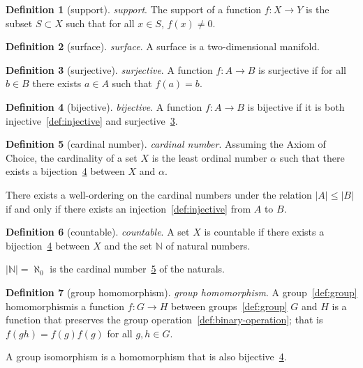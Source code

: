 \documentclass[12pt,a4paper]{article}
\theoremstyle{definition}
\newtheorem{definition}{Definition}
\begin{document}
\begin{definition}[support]\label{def:support}
\emph{support}. The support of a function $f: X \to Y$ is the subset $S \subset X$ such that for all $x \in S$, $f(x) \neq 0$.
\end{definition}

\begin{definition}[surface]\label{def:surface}
\emph{surface}. A surface is a two-dimensional manifold.
\end{definition}

\begin{definition}[surjective]\label{def:surjective}
\emph{surjective}. A function $f:A\to B$ is surjective if for all $b \in B$ there exists $a\in A$ such that $f(a)=b$.
\end{definition}

\begin{definition}[bijective]\label{def:bijective}
\emph{bijective}. A function $f:A\to B$ is bijective if it is both injective~\ref{def:injective} and surjective~\ref{def:surjective}.
\end{definition}

\begin{definition}[cardinal number]\label{def:cardinal-number}
\emph{cardinal number}. Assuming the Axiom of Choice, the cardinality of a set $X$ is the least ordinal number $\alpha$ such that there exists a bijection~\ref{def:bijective} between $X$ and $\alpha$. 

There exists a well-ordering on the cardinal numbers under the relation $\vert A\vert  \leq \vert B\vert $ if and only if there exists an injection~\ref{def:injective} from $A$ to $B$.
\end{definition}

\begin{definition}[countable]\label{def:countable}
\emph{countable}. A set $X$ is countable if there exists a bijection~\ref{def:bijective} between $X$ and the set $\mathbb N$ of natural numbers. 

$\vert \mathbb N\vert = \aleph_0$ is the cardinal number~\ref{def:cardinal-number} of the naturals.
\end{definition}

\begin{definition}[group homomorphism]\label{def:group-homomorphism}
\emph{group homomorphism}. A group~\ref{def:group} homomorphismis a function $f: G\to H$ between groups~\ref{def:group} $G$ and $H$ is a function that preserves the group operation~\ref{def:binary-operation}; that is $f(gh)=f(g)f(g)$ for all $g,h \in G$. 

A group isomorphism is a homomorphism that is also bijective~\ref{def:bijective}.
\end{definition}
\end{document}
